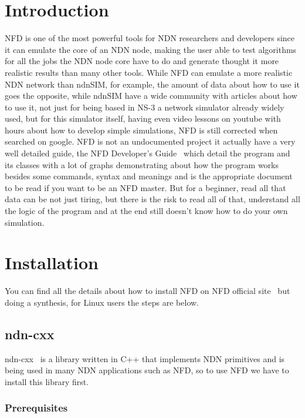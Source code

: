 \documentclass[11pt,conference]{./IEEEtran}
\begin{document}
	\section{Introduction}
NFD is one of the most powerful tools for NDN researchers and developers since it can emulate the core of an NDN node, making the user able to test algorithms for all the jobs the NDN node core have to do and generate thought it more realistic results than many other tools. While NFD can emulate a more realistic NDN network than ndnSIM, for example, the amount of data about how to use it goes the opposite, while ndnSIM have a wide community with articles about how to use it, not just for being based in NS-3 a network simulator already widely used, but for this simulator itself, having even video lessons on youtube with hours about how to develop simple simulations, NFD is still corrected when searched on google.
NFD is not an undocumented project it actually have a very well detailed guide, the NFD Developer’s Guide~\cite{devguide} which detail the program and its classes with a lot of graphs demonstrating about how the program works besides some commands, syntax and meanings and is the appropriate document to be read if you want to be an NFD master. But for a beginner, read all that data can be not just tiring, but there is the risk to read all of that, understand all the logic of the program and at the end still doesn't know how to do your own simulation.  
	
	\section{Installation}
You can find all the details about how to install NFD on NFD official site~\cite{NFD} but doing a synthesis, for Linux users the steps are below.

	\subsection{ndn-cxx}
	ndn-cxx~\cite{ndncxx} is a library written in C++ that implements NDN primitives and is being used in many NDN applications such as NFD, so to use NFD we have to install this library first.
	\subsubsection{Prerequisites}
	
\end{document}
